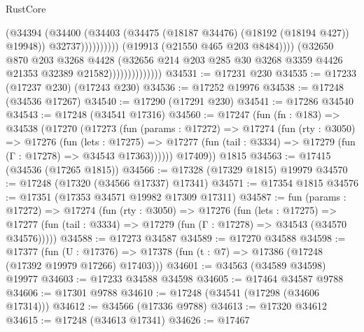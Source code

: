 \begin{lexlean}{RustCore}
\begin{coremodule}
                                                (@34394
                                                  (@34400
                                                    (@34403
                                                      (@34475
                                                        (@18187 @34476)
                                                        (@18192 (@18194 @427))
                                                        @19948))
                                                    @32737))))))))))
                                (@19913 (@21550 @465 @203 @8484))))
                            (@32650
                              @870
                              @203
                              @3268
                              @4428
                              (@32656
                                @214
                                @203
                                @285
                                @30
                                @3268
                                @3359
                                @4426
                                @21353
                                @32389
                                @21582))))))))))))))
@34531 := @17231 @230
@34535 := @17233 (@17237 @230) (@17243 @230)
@34536 := @17252 @19976
@34538 := @17248 (@34536 @17267)
@34540 := @17290 (@17291 @230)
@34541 := @17286 @34540
@34543 := @17248 (@34541 @17316)
@34560 := @17247
    (fun (fn : @183) =>
    @34538
      (@17270
        (@17273
          (fun (params : @17272) =>
          @17274
            (fun (rty : @3050) =>
            @17276
              (fun (lets : @17275) =>
              @17277 (fun (tail : @3334) => @17279 (fun (Γ : @17278) => @34543 @17363))))))
        @17409))
    @1815
@34563 := @17415 (@34536 (@17265 @1815))
@34566 := @17328 (@17329 @1815) @19979
@34570 := @17248 (@17320 (@34566 @17337) @17341)
@34571 := @17354 @1815
@34576 := @17351 (@17353 @34571 @19982 @17309 @17311)
@34587 := fun (params : @17272) =>
  @17274
    (fun (rty : @3050) =>
    @17276
      (fun (lets : @17275) =>
      @17277 (fun (tail : @3334) => @17279 (fun (Γ : @17278) => @34543 (@34570 @34576)))))
@34588 := @17273 @34587
@34589 := @17270 @34588
@34598 := @17377
    (fun (U : @17376) => @17378 (fun (t : @7) => @17386 (@17248 (@17392 @19979 @17266) @17403)))
@34601 := @34563 (@34589 @34598) @19977
@34603 := @17233 @34588 @34598
@34605 := @17464 @34587 @9788
@34606 := @17301 @9788
@34610 := @17248 (@34541 (@17298 (@34606 @17314)))
@34612 := @34566 (@17336 @9788)
@34613 := @17320 @34612
@34615 := @17248 (@34613 @17341)
@34626 := @17467

\end{coremodule}
\end{lexlean}
